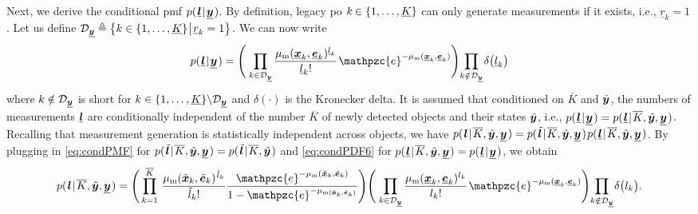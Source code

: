 \documentclass[11pt,a4paper]{article}
\newcommand{\ist}{\hspace*{.3mm}}
\newcommand{\rmv}{\hspace*{-.3mm}}
\newcommand{\cl}[1]{\mathcal{#1}}
\begin{document}
\begin{enumerate}
Next, we derive the conditional \ac{pmf} $p(\ist \underline{\V{l}} \ist | \ist \underline{\V{y}} \ist)$. By definition, legacy \ac{po} $k \rmv\in \{1,\dots,\underline{K}\}$ can only generate measurements if it exists, i.e., $\underline{r}_k = 1$. Let us define $\Set{D}_{\underline{\V{y}}} \triangleq \big\{ k \in \{1,\dots, \underline{K}\} \ist \big| \ist \underline{r}_k = 1 \big\}$. We can now \vspace{.5mm} write
\begin{equation}
p(\ist \underline{\V{l}} \ist | \ist \underline{\V{y}} \ist) = \Bigg ( \ist \prod_{k \in \cl{D}_{\underline{\V{y}}}} \frac{\mu_{\mathrm{m}} (\underline{\V{x}}_k,\underline{\V{e}}_k)^{\underline{l}_k}}{\underline{l}_{k}!} \ist \mathpzc{e}^{-\mu_{\mathrm{m}}(\underline{\V{x}}_k,\underline{\V{e}}_k)} \Bigg) \rmv \rmv \prod_{k \notin \cl{D}_{\underline{\V{y}}}}  \rmv \delta \big(\underline{l}_{k}\big)  \label{eq:condPDF6}
\vspace{.5mm}
\end{equation}
where $k \notin\Set{D}_{\underline{\V{y}}}$ is short for $ k \in \{1,\dots,\underline{K}\} \backslash \Set{D}_{\underline{\V{y}}}$ and $\delta( \cdot )$ is the Kronecker delta. It is assumed \cite{MeyKroWilLauHlaBraWin:J18,GraFatSve:J19} that conditioned on $\overline{K}$ and $\tilde{\bm{y}}$, the numbers of measurements $\underline{\bm{l}}$ are conditionally independent of the number $\overline{K}$ of newly detected objects and their states $\tilde{\bm{y}}$, i.e., $p(\ist \underline{\V{l}} \ist | \ist \underline{\V{y}} \ist)= p( \ist \underline{\V{l}} \ist | \ist \overline{K}, \tilde{\V{y}}, \underline{\V{y}} \ist)$. Recalling that measurement generation is statistically independent across objects, we have $p( \ist \V{l} \ist | \ist \overline{K}, \tilde{\V{y}}, \underline{\V{y}} \ist) = p( \ist \tilde{\V{l}} \ist | \ist \overline{K}, \tilde{\V{y}}, \underline{\V{y}}\ist) \ist p( \ist \underline{\V{l}} \ist | \ist \overline{K}, \tilde{\V{y}}, \underline{\V{y}}\ist)$. By plugging in  \eqref{eq:condPMF} for $p( \ist \tilde{\V{l}} \ist | \ist \overline{K}, \tilde{\V{y}}, \underline{\V{y}}\ist) = p( \ist \tilde{\V{l}} \ist | \ist \overline{K}, \tilde{\V{y}}\ist)$ and \eqref{eq:condPDF6} for $p( \ist \underline{\V{l}} \ist | \ist \overline{K}, \tilde{\V{y}}, \underline{\V{y}}\ist) = p( \ist \underline{\V{l}} \ist | \ist \underline{\V{y}} \ist)$, we obtain
\begin{equation}
p( \ist \V{l} \ist | \ist \overline{K}, \tilde{\V{y}}, \underline{\V{y}} \ist) = \Bigg(  \prod^{ \overline{K}}_{k= 1 }\ist\ist \frac{\mu_{\mathrm{m}}(\tilde{\V{x}}_{k},\tilde{\V{e}}_{k})^{\ist \tilde{l}_{k}}}{\tilde{l}_{k}!} \frac{\mathpzc{e}^{-\mu_{\mathrm{m}}(\tilde{\V{x}}_{k},\tilde{\V{e}}_{k})}}{1-\mathpzc{e}^{-\mu_{\mathrm{m}(\tilde{\V{x}}_{k},\tilde{\V{e}}_{k})}}} \Bigg) \Bigg ( \ist \prod_{k \in \cl{D}_{\underline{\V{y}}}} \frac{\mu_{\mathrm{m}} (\underline{\V{x}}_k,\underline{\V{e}}_k)^{l_k}}{l_{k}!} \ist \mathpzc{e}^{-\mu_{\mathrm{m}}(\underline{\V{x}}_k,\underline{\V{e}}_k)} \Bigg) \rmv\rmv  \prod_{k \notin \cl{D}_{\underline{\V{y}}}}  \rmv \delta \big(l_{k}\big). \label{eq:condPDF7}
\vspace{.5mm}
\end{equation}



\end{enumerate}
\end{document}
